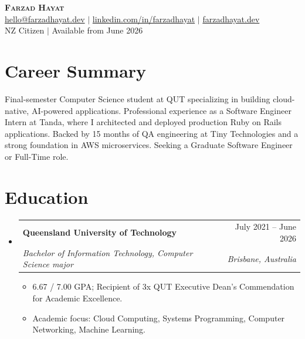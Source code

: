 \documentclass[a4paper,11pt]{article}
\makeatletter
\newcommand{\resumeItem}[1]{
  \item\small{
    {#1 \vspace{-2pt}}
  }
}
\newcommand{\resumeSubheading}[4]{
  \vspace{-2pt}\item
    \begin{tabular*}{0.97\textwidth}[t]{l@{\extracolsep{\fill}}r}
      \textbf{#1} & #2 \\
      \textit{\small#3} & \textit{\small #4} \\
    \end{tabular*}\vspace{-7pt}
}
\newcommand{\resumeSubHeadingListStart}{\begin{itemize}[leftmargin=0.15in, label={}]}
\newcommand{\resumeSubHeadingListEnd}{\end{itemize}}
\newcommand{\resumeItemListStart}{\begin{itemize}}
\newcommand{\resumeItemListEnd}{\end{itemize}\vspace{-5pt}}
\makeatother
\begin{document}

\begin{center}
    \textbf{\Huge \scshape Farzad Hayat} \\ \vspace{1pt}
    \small \href{mailto:hello@farzadhayat.dev}{hello@farzadhayat.dev} $|$ 
    \href{https://www.linkedin.com/in/farzadhayat}{linkedin.com/in/farzadhayat} $|$ 
    \href{https://www.farzadhayat.dev}{farzadhayat.dev} \\
    \vspace{1pt}
    \small NZ Citizen $|$ Available from June 2026
    \end{center}


\section{Career Summary}
\begin{itemize}[leftmargin=0.15in, label={}]
  \small{\item{
    Final-semester Computer Science student at QUT specializing in building cloud-native, AI-powered applications. Professional experience as a Software Engineer Intern at Tanda, where I architected and deployed production Ruby on Rails applications. Backed by 15 months of QA engineering at Tiny Technologies and a strong foundation in AWS microservices. Seeking a Graduate Software Engineer or Full-Time role.
  }}
\end{itemize}


\section{Education}
  \resumeSubHeadingListStart
    \resumeSubheading
      {Queensland University of Technology}{July 2021 -- June 2026}
      {Bachelor of Information Technology, Computer Science major}{Brisbane, Australia}
      \resumeItemListStart
        \resumeItem{6.67 / 7.00 GPA; Recipient of 3x QUT Executive Dean’s Commendation for Academic Excellence.}
        \resumeItem{Academic focus: Cloud Computing, Systems Programming, Computer Networking, Machine Learning.}
      \resumeItemListEnd
  \resumeSubHeadingListEnd
\end{document}
